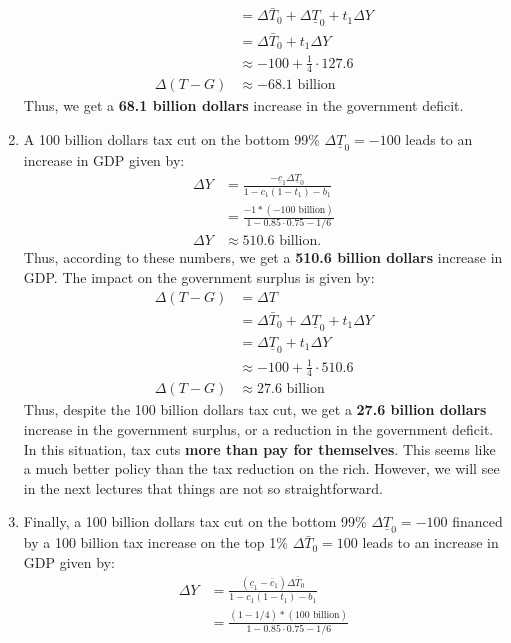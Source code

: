 \documentclass[]{book}
\theoremstyle{definition}
\theoremstyle{definition}
\theoremstyle{definition}
\theoremstyle{remark}
\begin{document}
\begin{enumerate}
\[\begin{aligned}
  &=\Delta\bar{T}_{0}+\Delta\underline{T}_{0}+t_1\Delta Y\\
  &=\Delta\bar{T}_{0}+t_1\Delta Y \\
  & \approx -100 + \frac{1}{4} \cdot 127.6\\
  \Delta\left(T-G\right)  & \approx-68.1 \text{ billion}
  \end{aligned}
  \] Thus, we get a \textbf{68.1 billion dollars} increase in the
  government deficit.
\item
  A 100 billion dollars tax cut on the bottom 99\%
  \(\Delta \underline{T}_0 = -100\) leads to an increase in GDP given
  by: \[
  \begin{aligned}
  \Delta Y &=\frac{-\underline{c}_1 \Delta \underline{T}_0}{1-c_1(1-t_1)-b_1}\\
  &=\frac{-1 * (-100 \text{ billion})}{1-0.85 \cdot 0.75-1/6}\\
  \Delta Y&\approx 510.6 \text{ billion}.
  \end{aligned}
  \] Thus, according to these numbers, we get a \textbf{510.6 billion
  dollars} increase in GDP. The impact on the government surplus is
  given by: \[
  \begin{aligned}
  \Delta\left(T-G\right)&=\Delta T\\
  &=\Delta\bar{T}_{0}+\Delta\underline{T}_{0}+t_1\Delta Y\\
  &=\Delta\underline{T}_{0}+t_1\Delta Y \\
  & \approx -100 + \frac{1}{4} \cdot 510.6\\
  \Delta\left(T-G\right)  & \approx 27.6 \text{ billion}
  \end{aligned}
  \] Thus, despite the 100 billion dollars tax cut, we get a
  \textbf{27.6 billion dollars} increase in the government surplus, or a
  reduction in the government deficit. In this situation, tax cuts
  \textbf{more than pay for themselves}. This seems like a much better
  policy than the tax reduction on the rich. However, we will see in the
  next lectures that things are not so straightforward.
\item
  Finally, a 100 billion dollars tax cut on the bottom 99\%
  \(\Delta \underline{T}_0 = -100\) financed by a 100 billion tax
  increase on the top 1\% \(\Delta \bar{T}_0 = 100\) leads to an
  increase in GDP given by: \[
  \begin{aligned}
  \Delta Y &=\frac{(\underline{c}_1-\bar{c}_1) \Delta \bar{T}_0}{1-c_1(1-t_1)-b_1}\\
  &=\frac{(1-1/4) * (100 \text{ billion})}{1-0.85 \cdot 0.75-1/6}\\

\end{aligned}\]
\end{enumerate}
\end{document}
